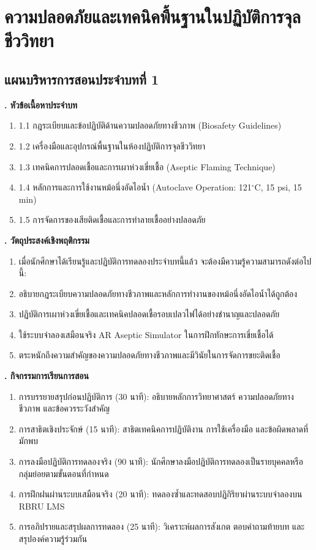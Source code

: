 \chapter{ความปลอดภัยและเทคนิคพื้นฐานในปฏิบัติการจุลชีววิทยา}
\label{chap:ch01}

\section*{แผนบริหารการสอนประจำบทที่ 1}

\noindent\textbf{. หัวข้อเนื้อหาประจำบท}

\begin{enumerate}
    \item 1.1 กฎระเบียบและข้อปฏิบัติด้านความปลอดภัยทางชีวภาพ (Biosafety Guidelines)
    \item 1.2 เครื่องมือและอุปกรณ์พื้นฐานในห้องปฏิบัติการจุลชีววิทยา
    \item 1.3 เทคนิคการปลอดเชื้อและการเผาห่วงเขี่ยเชื้อ (Aseptic Flaming Technique)
    \item 1.4 หลักการและการใช้งานหม้อนึ่งอัดไอน้ำ (Autoclave Operation: 121$^{\circ}$C, 15 psi, 15 min)
    \item 1.5 การจัดการของเสียติดเชื้อและการทำลายเชื้ออย่างปลอดภัย
\end{enumerate}

\noindent\textbf{. วัตถุประสงค์เชิงพฤติกรรม}

\begin{enumerate}
    \item เมื่อนักศึกษาได้เรียนรู้และปฏิบัติการทดลองประจำบทนี้แล้ว จะต้องมีความรู้ความสามารถดังต่อไปนี้:
    \item อธิบายกฎระเบียบความปลอดภัยทางชีวภาพและหลักการทำงานของหม้อนึ่งอัดไอน้ำได้ถูกต้อง
    \item ปฏิบัติการเผาห่วงเขี่ยเชื้อและเทคนิคปลอดเชื้อรอบเปลวไฟได้อย่างชำนาญและปลอดภัย
    \item ใช้ระบบจำลองเสมือนจริง AR Aseptic Simulator ในการฝึกทักษะการเขี่ยเชื้อได้
    \item ตระหนักถึงความสำคัญของความปลอดภัยทางชีวภาพและมีวินัยในการจัดการขยะติดเชื้อ
\end{enumerate}

\noindent\textbf{. กิจกรรมการเรียนการสอน}

\begin{enumerate}
    \item การบรรยายสรุปก่อนปฏิบัติการ (30 นาที): อธิบายหลักการวิทยาศาสตร์ ความปลอดภัยทางชีวภาพ และข้อควรระวังสำคัญ
    \item การสาธิตเชิงประจักษ์ (15 นาที): สาธิตเทคนิคการปฏิบัติงาน การใช้เครื่องมือ และข้อผิดพลาดที่มักพบ
    \item การลงมือปฏิบัติการทดลองจริง (90 นาที): นักศึกษาลงมือปฏิบัติการทดลองเป็นรายบุคคลหรือกลุ่มย่อยตามขั้นตอนที่กำหนด
    \item การฝึกฝนผ่านระบบเสมือนจริง (20 นาที): ทดลองซ้ำและทดสอบปฏิกิริยาผ่านระบบจำลองบน RBRU LMS
    \item การอภิปรายและสรุปผลการทดลอง (25 นาที): วิเคราะห์ผลการสังเกต ตอบคำถามท้ายบท และสรุปองค์ความรู้ร่วมกัน
\end{enumerate}

